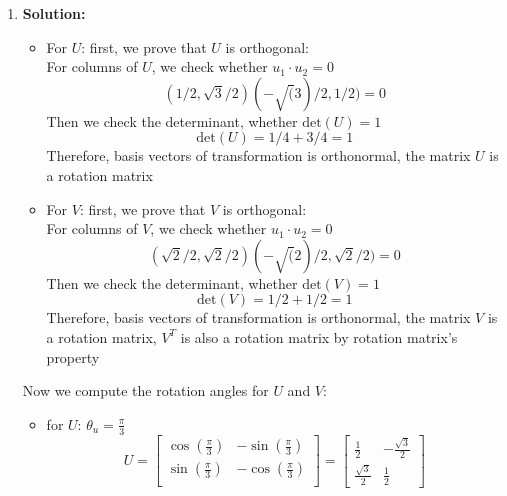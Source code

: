 \begin{enumerate}
        
        
    \item \textbf{Solution:}
        \begin{itemize}
            \item For \(U\):
                first, we prove that \(U\) is orthogonal:\\
                For columns of \(U\), we check whether \(u_1 \cdot u_2 = 0\)
                \[
                    (1/2 , \sqrt{3}/2) (-\sqrt(3) / 2 , 1/2) = 0
                \] 
                Then we check the determinant, whether \(\text{det}(U) = 1\)
                \[
                    \text{det}(U) = 1/4 + 3/4 = 1
                \]
                Therefore, basis vectors of transformation is orthonormal, the matrix \(U\) is a rotation matrix
            \item For \(V\):
                first, we prove that \(V\) is orthogonal:\\
                For columns of \(V\), we check whether \(u_1 \cdot u_2 = 0\)
                \[
                    (\sqrt{2}/2 , \sqrt{2}/2) (-\sqrt(2) / 2 , \sqrt{2}/2) = 0
                \]
                Then we check the determinant, whether \(\text{det}(V) = 1\)
                \[
                    \text{det}(V) = 1/2 + 1/2 = 1
                \]
                Therefore, basis vectors of transformation is orthonormal, the matrix \(V\) is a rotation matrix, \(V^T\) is also a rotation matrix by 
                rotation matrix's property
        \end{itemize}
        Now we compute the rotation angles for \(U\) and \(V\):
        \begin{itemize}
            \item for \( U\):
                \(\theta_u = \frac{\pi}{3}\)\\
                \[
                    U =\begin{bmatrix}
                        \cos(\frac{\pi}{3}) & -\sin(\frac{\pi}{3})\\
                        \sin(\frac{\pi}{3}) & -\cos(\frac{\pi}{3})\\
                      \end{bmatrix}
                     = \begin{bmatrix}
                         \frac{1}{2} & -\frac{\sqrt{3}}{2} \\
                         \frac{\sqrt{3}}{2} & \frac{1}{2}
                       \end{bmatrix}
                \]

\end{itemize}
\end{enumerate}
